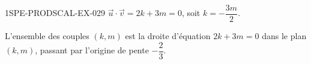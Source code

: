 \begin{corrige}{1SPE-PRODSCAL-EX-029}
$\vec{u} \cdot \vec{v} = 2k + 3m = 0$, soit $k = -\dfrac{3m}{2}$.

L'ensemble des couples $(k, m)$ est la droite d'équation $2k + 3m = 0$ dans le plan $(k, m)$, passant par l'origine de pente $-\dfrac{2}{3}$.
\end{corrige}
